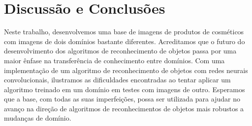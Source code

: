 \documentclass[conference]{IEEEtran}
\begin{document}
\section{Discussão e Conclusões}
Neste trabalho, desenvolvemos uma base de imagens de produtos de cosméticos com imagens de dois domínios bastante diferentes. Acreditamos que o futuro do desenvolvimento dos algoritmos de reconhecimento de objetos passa por uma maior ênfase na transferência de conhecimento entre domínios. Com uma implementação de um algoritmo de reconhecimento de objetos com redes neurais convolucionais, ilustramos as dificuldades encontradas ao tentar aplicar um algoritmo treinado em um domínio em testes com imagens de outro. Esperamos que a base, com todas as suas imperfeições, possa ser utilizada para ajudar no avanço na direção de algoritmos de reconhecimentos de objetos mais robustos a mudanças de domínio. 




\end{document}
